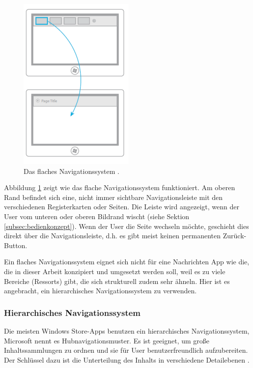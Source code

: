 \documentclass[12pt,a4paper,bibtotoc,abstracton]{scrartcl}
\begin{document}
\begin{figure}[h]	
	\centering
	\includegraphics[scale=1]{Bilder/Abbildungen/ms_navigation_flach.png} 
	\caption[Das flache Navigationssystem]{Das flaches Navigationssystem \protect\citep{MicrosoftNavidesign2013}.}
	\label{fig:naviflach}
\end{figure}

Abbildung \ref{fig:naviflach} zeigt wie das flache Navigationssystem funktioniert. Am oberen Rand befindet sich eine, nicht immer sichtbare Navigationsleiste mit den verschiedenen Registerkarten oder Seiten. Die Leiste wird angezeigt, wenn der User vom unteren oder oberen Bildrand wischt (siehe Sektion \ref{subsec:bedienkonzept}). Wenn der User die Seite wechseln möchte, geschieht dies  direkt über die Navigationsleiste, d.h. es gibt meist keinen permanenten Zurück-Button. 

Ein flaches Navigationssystem eignet sich nicht für eine Nachrichten App wie die, die in dieser Arbeit konzipiert und umgesetzt werden soll, weil es zu viele Bereiche (Ressorts) gibt, die sich strukturell zudem sehr ähneln. Hier ist es angebracht, ein hierarchisches Navigationssystem zu verwenden.    


\subsubsection{Hierarchisches Navigationssystem}
\label{subsubsec:hierachischessystem}
Die meisten Windows Store-Apps benutzen ein hierarchisches Navigationssystem, Microsoft nennt es Hubnavigationsmuster. Es ist geeignet, um große Inhaltssammlungen zu ordnen und sie für User benutzerfreundlich aufzubereiten. Der Schlüssel dazu ist die Unterteilung des Inhalts in verschiedene Detailebenen \citep{MicrosoftNavidesign2013}.
\end{document}
